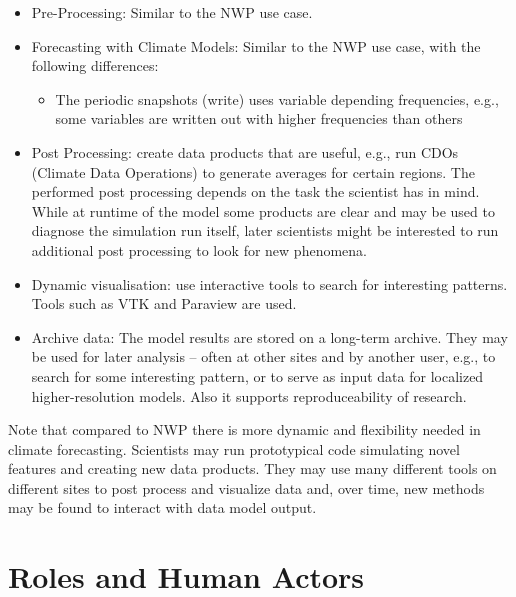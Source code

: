 \begin{itemize}
	\item Pre-Processing: Similar to the NWP use case.
	\item Forecasting with Climate Models: Similar to the NWP use case, with the following differences:
	\begin{itemize}
		\item The periodic snapshots (write) uses variable depending frequencies, e.g., some variables are written out with higher frequencies than others
	\end{itemize}
	\item Post Processing: create data products that are useful, e.g., run CDOs (Climate Data Operations) to generate averages for certain regions. The performed post processing depends on the task the scientist has in mind. While at runtime of the model some products are clear and may be used to diagnose the simulation run itself, later scientists might be interested to run additional post processing to look for new phenomena.
	\item Dynamic visualisation: use interactive tools to search for interesting patterns. Tools such as VTK and  Paraview are used. %
	\item Archive data: The model results are stored on a long-term archive. They may be used for later analysis --  often at other sites and by another user, e.g., to search for some interesting pattern, or to serve as input data for localized higher-resolution models. Also it supports reproduceability of research.
\end{itemize}

Note that compared to NWP there is more dynamic and flexibility needed in climate forecasting.
Scientists may run prototypical code simulating novel features and creating new data products.
They may use many different tools on different sites to post process and visualize data and, over time, new methods may be found to interact with data model output.

\section{Roles and Human Actors}
\label{sec:use cases/actors}


